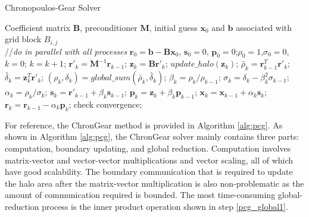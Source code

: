 \begin{algorithm}[!h]
\caption{Chronopoulos-Gear Solver}
\label{alg:pcg}
\begin{algorithmic}[1]
\REQUIRE Coefficient matrix $\textbf{B}$, preconditioner $\textbf{M}$, initial guess $\textbf{x}_0$ and $\textbf{b}$ associated with grid block $B_{i,j}$ \\
//\qquad    \textit{do in parallel with all processes}
\STATE $\textbf{r}_0 = \textbf{b}-\textbf{B}\textbf{x}_0$, $\textbf{s}_0 =0$, $\textbf{p}_0 =0$;\quad $\rho_0=1$,$\sigma_0=0$, $k=0$;
\STATE $k=k+1$;
\STATE $\textbf{r}'_{k} =\textbf{M}^{-1}\textbf{r}_{k-1}$; \label{pcg_scale1} 
\STATE $\textbf{z}_k = \textbf{B}\textbf{r}'_{k}$; \label{pcg_mat}
\STATE $update\_halo(\textbf{z}_{k})$;  \label{pcg_bc1}
\STATE $\tilde{\rho_k} = \textbf{r}_{k-1}^T\textbf{r}'_{k}$;\label{pcg_dot1}
\STATE $\tilde{\delta_k} = \textbf{z}_k^T\textbf{r}'_k$;\label{pcg_dot2}
\STATE $(\rho_k,\delta_k) = global\_sum(\tilde{\rho_k},\tilde{\delta_k})$;\label{pcg_global1} 
\STATE $\beta_k = \rho_k / \rho_{k-1}$;\label{pcg_beta}
\STATE $\sigma_k = \delta_k - \beta_k^2\sigma_{k-1}$;\label{pcg_sigma}
\STATE $\alpha_k = \rho_k /\sigma_{k}$;\label{pcg_alpha}
\STATE $\textbf{s}_k = \textbf{r}'_{k-1} +\beta_k\textbf{s}_{k-1}$;\label{pcg_scale1}
\STATE $\textbf{p}_k = \textbf{z}_{k} +\beta_k\textbf{p}_{k-1}$;\label{pcg_scale2}
\STATE $\textbf{x}_k =\textbf{x}_{k-1} +\alpha_k \textbf{s}_k$;\label{pcg_scale3}
\STATE $\textbf{r}_k =\textbf{r}_{k-1} -\alpha_k\textbf{p}_k$;\label{pcg_scale4}
\STATE check convergence;
\ENDIF
\ENDWHILE
\end{algorithmic}
\end{algorithm}

For reference, the ChronGear method is provided in Algorithm
\ref{alg:pcg}.  As shown in Algorithm \ref{alg:pcg}, the ChronGear
solver mainly contains three parts: computation, boundary updating,
and global reduction.  Computation involves matrix-vector and
vector-vector multiplications and vector scaling, all of which have good scalability.  The boundary communication that is required to
update the halo area after the matrix-vector multiplication is also
non-problematic as the amount of communication required is
bounded. The most time-consuming global-reduction process is the inner
product operation shown in step \ref{pcg_global1}.

